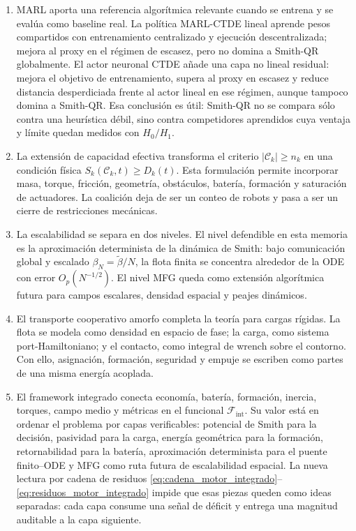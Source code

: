 \begin{enumerate}
  \item MARL aporta una referencia algorítmica relevante cuando se entrena y se evalúa
  como baseline real. La política MARL-CTDE lineal aprende pesos compartidos con
  entrenamiento centralizado y ejecución descentralizada; mejora al proxy en el régimen
  de escasez, pero no domina a Smith-QR globalmente. El actor neuronal CTDE añade una
  capa no lineal residual: mejora el objetivo de entrenamiento, supera al proxy en
  escasez y reduce distancia desperdiciada frente al actor lineal en ese régimen, aunque
  tampoco domina a Smith-QR. Esa conclusión es útil: Smith-QR no se compara sólo contra
  una heurística débil, sino contra competidores aprendidos cuya ventaja y límite quedan
  medidos con $H_0/H_1$.

  \item La extensión de capacidad efectiva transforma el criterio
  $|\mathcal C_k|\ge n_k$ en una condición física
  $S_k(\mathcal C_k,t)\ge D_k(t)$. Esta formulación permite incorporar masa, torque,
  fricción, geometría, obstáculos, batería, formación y saturación de actuadores. La
  coalición deja de ser un conteo de robots y pasa a ser un cierre de restricciones
  mecánicas.

  \item La escalabilidad se separa en dos niveles. El nivel defendible en esta memoria es
  la aproximación determinista de la dinámica de Smith: bajo comunicación global y
  escalado $\beta_N=\tilde\beta/N$, la flota finita se concentra alrededor de la ODE con
  error $O_p(N^{-1/2})$. El nivel MFG queda como extensión algorítmica futura para campos
  escalares, densidad espacial y peajes dinámicos.

  \item El transporte cooperativo amorfo completa la teoría para cargas rígidas. La flota
  se modela como densidad en espacio de fase; la carga, como sistema port-Hamiltoniano; y
  el contacto, como integral de wrench sobre el contorno. Con ello, asignación, formación,
  seguridad y empuje se escriben como partes de una misma energía acoplada.

  \item El framework integrado conecta economía, batería, formación, inercia, torques,
  campo medio y métricas en el funcional $\mathcal F_{\mathrm{int}}$. Su valor está en
  ordenar el problema por capas verificables: potencial de Smith para la decisión,
  pasividad para la carga, energía geométrica para la formación, retornabilidad para la
  batería, aproximación determinista para el puente finito--ODE y MFG como ruta futura de
  escalabilidad espacial. La nueva lectura por cadena de residuos
  \eqref{eq:cadena_motor_integrado}--\eqref{eq:residuos_motor_integrado} impide que esas
  piezas queden como ideas separadas: cada capa consume una señal de déficit y entrega
  una magnitud auditable a la capa siguiente.


\end{enumerate}

